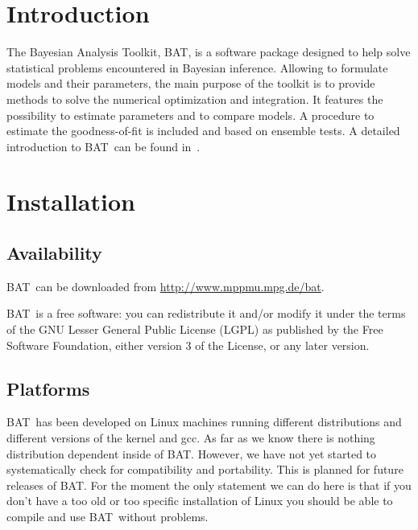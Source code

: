 \documentclass[11pt, a4paper]{article}
\newcommand{\bat}{{\sc BAT}}
\begin{document}
\section{Introduction}
\label{section:introduction}

The Bayesian Analysis Toolkit, \bat, is a software package designed to
help solve statistical problems encountered in Bayesian
inference. Allowing to formulate models and their parameters, the main
purpose of the toolkit is to provide methods to solve the numerical
optimization and integration. It features the possibility to estimate
parameters and to compare models. A procedure to estimate the
goodness-of-fit is included and based on ensemble tests. A detailed
introduction to \bat\ can be found in~\cite{Caldwell:2008fw}.


\section{Installation}
\label{section:installation}

\subsection{Availability}

\bat\ can be downloaded from \url{http://www.mppmu.mpg.de/bat}.

\bigskip

\noindent
\bat\ is a free software: you can redistribute it and/or modify it
under the terms of the GNU Lesser General Public License (LGPL) as
published by the Free Software Foundation, either version 3 of
the License, or any later version.


\subsection{Platforms}

\bat\ has been developed on Linux machines running different distributions
and different versions of the kernel and gcc. As far as we know there
is nothing distribution dependent inside of \bat. However, we have not
yet started to systematically check for compatibility and
portability. This is planned for future releases of \bat. For the
moment the only statement we can do here is that if you don't have a
too old or too specific installation of Linux you should be able to
compile and use \bat\ without problems. \\
\end{document}
